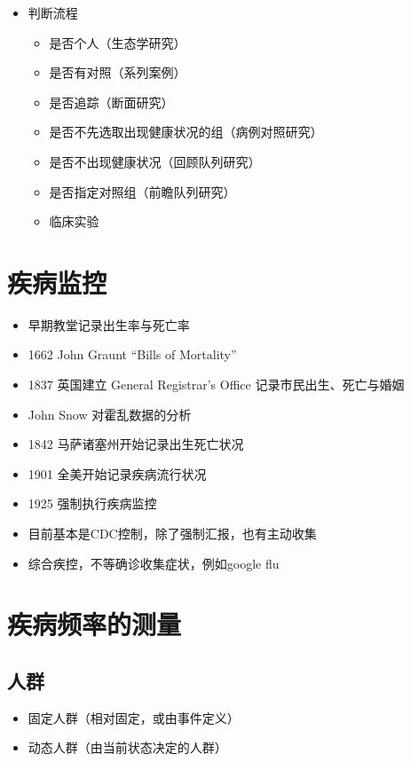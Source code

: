 \documentclass[]{book}
\providecommand{\tightlist}{%
  \setlength{\itemsep}{0pt}\setlength{\parskip}{0pt}}
\begin{document}
\begin{itemize}
\tightlist
\item
  判断流程

  \begin{itemize}
  \tightlist
  \item
    是否个人（生态学研究）
  \item
    是否有对照（系列案例）
  \item
    是否追踪（断面研究）
  \item
    是否不先选取出现健康状况的组（病例对照研究）
  \item
    是否不出现健康状况（回顾队列研究）
  \item
    是否指定对照组（前瞻队列研究）
  \item
    临床实验
  \end{itemize}
\end{itemize}

\section{疾病监控}

\begin{itemize}
\tightlist
\item
  早期教堂记录出生率与死亡率
\item
  1662 John Graunt ``Bills of Mortality''
\item
  1837 英国建立 General Registrar's Office 记录市民出生、死亡与婚姻
\item
  John Snow 对霍乱数据的分析
\item
  1842 马萨诸塞州开始记录出生死亡状况
\item
  1901 全美开始记录疾病流行状况
\item
  1925 强制执行疾病监控
\item
  目前基本是CDC控制，除了强制汇报，也有主动收集
\item
  综合疾控，不等确诊收集症状，例如google flu
\end{itemize}

\section{疾病频率的测量}

\subsection{人群}

\begin{itemize}
\tightlist
\item
  固定人群（相对固定，或由事件定义）
\item
  动态人群（由当前状态决定的人群）
\end{itemize}
\end{document}
